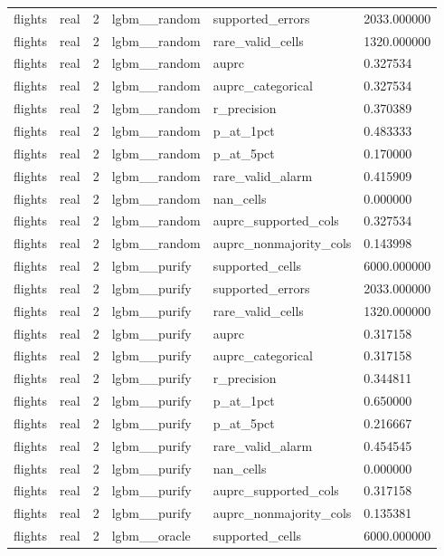 \begin{tabular}{llllll}
flights & real & 2 & lgbm\_\_random & supported\_errors & 2033.000000 \\
flights & real & 2 & lgbm\_\_random & rare\_valid\_cells & 1320.000000 \\
flights & real & 2 & lgbm\_\_random & auprc & 0.327534 \\
flights & real & 2 & lgbm\_\_random & auprc\_categorical & 0.327534 \\
flights & real & 2 & lgbm\_\_random & r\_precision & 0.370389 \\
flights & real & 2 & lgbm\_\_random & p\_at\_1pct & 0.483333 \\
flights & real & 2 & lgbm\_\_random & p\_at\_5pct & 0.170000 \\
flights & real & 2 & lgbm\_\_random & rare\_valid\_alarm & 0.415909 \\
flights & real & 2 & lgbm\_\_random & nan\_cells & 0.000000 \\
flights & real & 2 & lgbm\_\_random & auprc\_supported\_cols & 0.327534 \\
flights & real & 2 & lgbm\_\_random & auprc\_nonmajority\_cols & 0.143998 \\
flights & real & 2 & lgbm\_\_purify & supported\_cells & 6000.000000 \\
flights & real & 2 & lgbm\_\_purify & supported\_errors & 2033.000000 \\
flights & real & 2 & lgbm\_\_purify & rare\_valid\_cells & 1320.000000 \\
flights & real & 2 & lgbm\_\_purify & auprc & 0.317158 \\
flights & real & 2 & lgbm\_\_purify & auprc\_categorical & 0.317158 \\
flights & real & 2 & lgbm\_\_purify & r\_precision & 0.344811 \\
flights & real & 2 & lgbm\_\_purify & p\_at\_1pct & 0.650000 \\
flights & real & 2 & lgbm\_\_purify & p\_at\_5pct & 0.216667 \\
flights & real & 2 & lgbm\_\_purify & rare\_valid\_alarm & 0.454545 \\
flights & real & 2 & lgbm\_\_purify & nan\_cells & 0.000000 \\
flights & real & 2 & lgbm\_\_purify & auprc\_supported\_cols & 0.317158 \\
flights & real & 2 & lgbm\_\_purify & auprc\_nonmajority\_cols & 0.135381 \\
flights & real & 2 & lgbm\_\_oracle & supported\_cells & 6000.000000 \\

\end{tabular}
